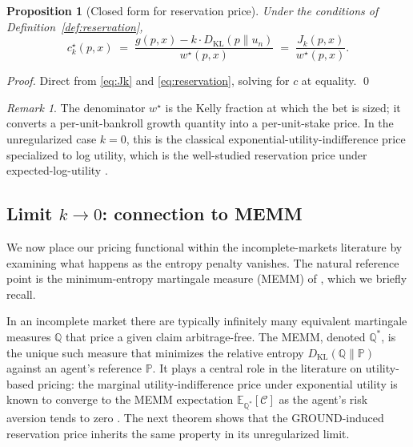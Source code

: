 \documentclass[11pt]{article}
\newtheorem{proposition}[theorem]{Proposition}
\theoremstyle{definition}
\theoremstyle{remark}
\newtheorem{remark}[theorem]{Remark}
\newcommand{\E}{\mathbb{E}}
\newcommand{\PP}{\mathbb{P}}
\newcommand{\Q}{\mathbb{Q}}
\newcommand{\C}{\mathcal{C}}
\newcommand{\G}{g}
\newcommand{\KL}{D_{\mathrm{KL}}}
\begin{document}
\begin{proposition}[Closed form for reservation price]\label{prop:reservation}
Under the conditions of Definition~\ref{def:reservation},
\begin{equation}
c^\star_k(p, x) \;=\; \frac{\G(p, x) - k \cdot \KL(p \| u_n)}{w^\star(p, x)}
                \;=\; \frac{J_k(p, x)}{w^\star(p, x)}.
\label{eq:reservation-form}
\end{equation}
\end{proposition}

\begin{proof}
Direct from \eqref{eq:Jk} and \eqref{eq:reservation}, solving for $c$
at equality. \qed
\end{proof}

\begin{remark}
The denominator $w^\star$ is the Kelly fraction at which the bet is
sized; it converts a per-unit-bankroll growth quantity into a
per-unit-stake price. In the unregularized case $k = 0$, this is the
classical exponential-utility-indifference price specialized to log
utility, which is the well-studied reservation price under
expected-log-utility \citep{maclean2011}.
\end{remark}

\subsection{Limit \texorpdfstring{$k \to 0$}{k to 0}: connection to MEMM}

We now place our pricing functional within the incomplete-markets
literature by examining what happens as the entropy penalty vanishes.
The natural reference point is the minimum-entropy martingale measure
(MEMM) of \citet{frittelli2000}, which we briefly recall.

In an incomplete market there are typically infinitely many
equivalent martingale measures $\Q$ that price a given claim
arbitrage-free. The MEMM, denoted $\Q^*$, is the unique such measure
that minimizes the relative entropy $\KL(\Q \| \PP)$ against an
agent's reference $\PP$. It plays a central role in the literature on
utility-based pricing: the marginal utility-indifference price under
exponential utility is known to converge to the MEMM expectation
$\E_{\Q^*}[\C]$ as the agent's risk aversion tends to zero
\citep{frittelli2000,delbaen2002,fujiwara2003}. The next theorem
shows that the GROUND-induced reservation price inherits the same
property in its unregularized limit.
\end{document}

